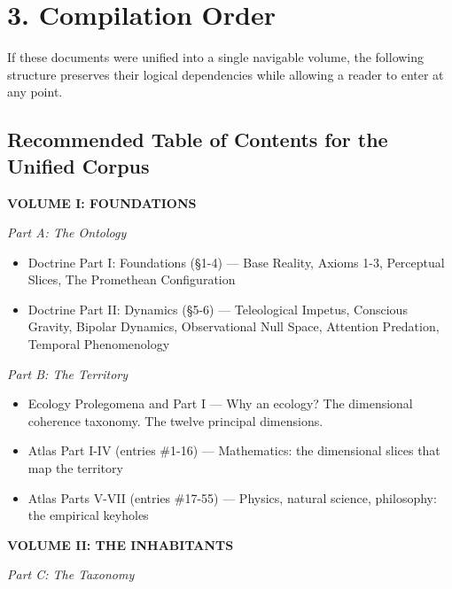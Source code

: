 \bigskip\noindent\makebox[\textwidth]{\color{rulegray}\rule{5cm}{0.3pt}}\bigskip


\section*{3. Compilation Order}


If these documents were unified into a single navigable volume, the following structure preserves their logical dependencies while allowing a reader to enter at any point.


\subsection*{Recommended Table of Contents for the Unified Corpus}


\bigskip\noindent\makebox[\textwidth]{\color{rulegray}\rule{5cm}{0.3pt}}\bigskip


\textbf{VOLUME I: FOUNDATIONS}


\textit{Part A: The Ontology}

\begin{itemize}[nosep,leftmargin=*]
  \item Doctrine Part I: Foundations (§1-4) — Base Reality, Axioms 1-3, Perceptual Slices, The Promethean Configuration
  \item Doctrine Part II: Dynamics (§5-6) — Teleological Impetus, Conscious Gravity, Bipolar Dynamics, Observational Null Space, Attention Predation, Temporal Phenomenology
\end{itemize}


\textit{Part B: The Territory}

\begin{itemize}[nosep,leftmargin=*]
  \item Ecology Prolegomena and Part I — Why an ecology? The dimensional coherence taxonomy. The twelve principal dimensions.
  \item Atlas Part I-IV (entries \#1-16) — Mathematics: the dimensional slices that map the territory
  \item Atlas Parts V-VII (entries \#17-55) — Physics, natural science, philosophy: the empirical keyholes
\end{itemize}


\bigskip\noindent\makebox[\textwidth]{\color{rulegray}\rule{5cm}{0.3pt}}\bigskip


\textbf{VOLUME II: THE INHABITANTS}


\textit{Part C: The Taxonomy}

